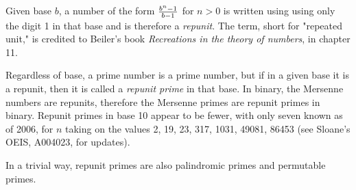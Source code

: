\documentclass[12pt]{article}
\begin{document}
Given base $b$, a number of the form ${{b^n - 1} \over {b - 1}}$ for $n > 0$ is written using using only the digit 1 in that base and is therefore a {\em repunit}. The term, short for "repeated unit," is credited to Beiler's book {\it Recreations in the theory of numbers}, in chapter 11.

Regardless of base, a prime number is a prime number, but if in a given base it is a repunit, then it is called a {\em repunit prime} in that base. In binary, the Mersenne numbers are repunits, therefore the Mersenne primes are repunit primes in binary. Repunit primes in base 10 appear to be fewer, with only seven known as of 2006, for $n$ taking on the values 2, 19, 23, 317, 1031, 49081, 86453 (see Sloane's OEIS, A004023, for updates).

In a trivial way, repunit primes are also palindromic primes and permutable primes.
\end{document}
